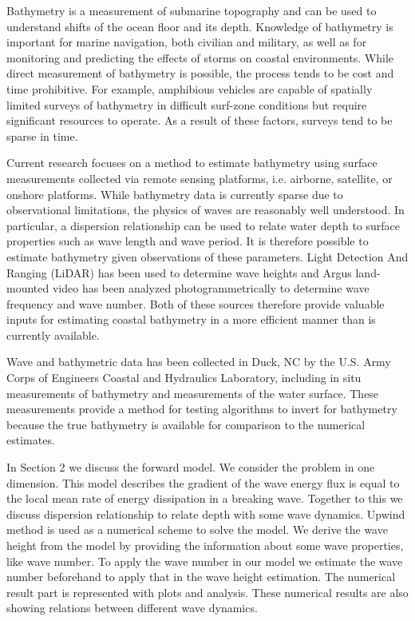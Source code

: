 Bathymetry is a measurement of submarine topography and can be used to understand shifts of the ocean floor and its depth. Knowledge of bathymetry is important for marine navigation, both civilian and military, as well as for monitoring and predicting the effects of storms on coastal environments. While direct measurement of bathymetry is possible, the process tends to be cost and time prohibitive. For example, amphibious vehicles are capable of spatially limited surveys of bathymetry in difficult surf-zone conditions but require significant resources to operate. As a result of these factors, surveys tend to be sparse in time. 


Current research focuses on a method to estimate bathymetry using surface measurements collected via remote sensing platforms, i.e. airborne, satellite, or onshore platforms. While bathymetry data is currently sparse due to observational limitations, the physics of waves are reasonably well understood. In particular, a dispersion relationship can be used to relate water depth to surface properties such as wave length and wave period. It is therefore possible to estimate bathymetry given observations of these parameters. Light Detection And Ranging (LiDAR) has been used to determine wave heights and Argus land-mounted video has been analyzed photogrammetrically to determine wave frequency and wave number. Both of these sources therefore provide valuable inputs for estimating coastal bathymetry in a more efficient manner than is currently available.



Wave and bathymetric data has been collected in Duck, NC by the U.S. Army Corps of Engineers Coastal and Hydraulics Laboratory, including in situ measurements of bathymetry and measurements of the water surface. These measurements provide a method for testing algorithms to invert for bathymetry because the true bathymetry is available for comparison to the numerical estimates.

In Section 2 we discuss the forward model. We consider the problem in one dimension. This model describes the gradient of the wave energy flux is equal to the local mean rate of energy dissipation in a breaking wave. Together to this we discuss dispersion relationship to relate depth with some wave dynamics. Upwind method is used as a numerical scheme to solve the model. We derive the wave height from the model by providing the information about some wave properties, like wave number. To apply the wave number in our model we estimate the wave number beforehand to apply that in the wave height estimation. The numerical result part is represented with plots and analysis. These numerical results are also showing relations between different wave dynamics.    
